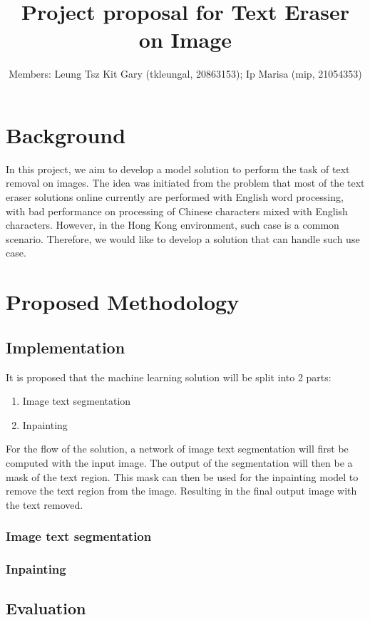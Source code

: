 \documentclass[10pt,twocolumn,letterpaper]{article}
\begin{document}
\title{Project proposal for Text Eraser on Image}

\author{
Members: Leung Tsz Kit Gary (tkleungal, 20863153);  %
Ip Marisa (mip, 21054353)
}
\maketitle

\section{Background}

In this project, we aim to develop a model solution to perform the task of text removal on images. 
The idea was initiated from the problem that most of the text eraser solutions online currently are performed with English word processing, 
with bad performance on processing of Chinese characters mixed with English characters. 
However, in the Hong Kong environment, such case is a common scenario. Therefore, we would like to develop a solution that can handle such use case.

\section{Proposed Methodology}

\subsection{Implementation}

It is proposed that the machine learning solution will be split into 2 parts:
\begin{enumerate}
    \item Image text segmentation
    \item Inpainting
\end{enumerate}

For the flow of the solution, a network of image text segmentation will first be computed with the input image.
The output of the segmentation will then be a mask of the text region.
This mask can then be used for the inpainting model to remove the text region from the image.
Resulting in the final output image with the text removed.

\subsubsection{Image text segmentation}


\subsubsection{Inpainting}


\subsection{Evaluation}

\end{document}
